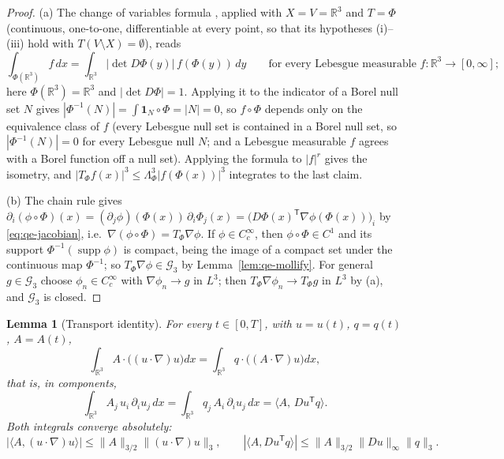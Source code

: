 \documentclass[11pt]{article}
\newtheorem{lemma}[theorem]{Lemma}
\theoremstyle{definition}
\theoremstyle{plain}
\newcommand{\R}{\mathbb R}
\newcommand{\norm}[1]{\lVert #1\rVert}
\begin{document}
\begin{proof}
(a) The change of variables formula \cite[Thm.~7.26]{Rudin1987}, applied
with $X=V=\R^3$ and $T=\Phi$ (continuous, one-to-one, differentiable at
every point, so that its hypotheses (i)--(iii) hold with
$T(V\setminus X)=\emptyset$), reads
\[
 \int_{\Phi(\R^3)}f\,dx=\int_{\R^3}|\det D\Phi(y)|\,f(\Phi(y))\,dy
 \qquad\text{for every Lebesgue measurable }f:\R^3\to[0,\infty];
\]
here $\Phi(\R^3)=\R^3$ and $|\det D\Phi|=1$.  Applying it to the indicator
of a Borel null set $N$ gives $|\Phi^{-1}(N)|=\int\mathbf 1_N\circ\Phi=|N|=0$,
so $f\circ\Phi$ depends only on the equivalence class of $f$ (every
Lebesgue null set is contained in a Borel null set, so
$|\Phi^{-1}(N)|=0$ for every Lebesgue null $N$; and a Lebesgue
measurable $f$ agrees with a Borel function off a null set).  Applying the
formula to $|f|^r$ gives the isometry, and
$|T_\Phi f(x)|^3\le\Lambda_\Phi^3|f(\Phi(x))|^3$ integrates to the last
claim.

(b) The chain rule gives
$\partial_i(\phi\circ\Phi)(x)=(\partial_j\phi)(\Phi(x))\,\partial_i\Phi_j(x)
=\bigl(D\Phi(x)^{\mathsf T}\nabla\phi(\Phi(x))\bigr)_i$ by
\eqref{eq:qe-jacobian}, i.e.\ $\nabla(\phi\circ\Phi)=T_\Phi\nabla\phi$.  If
$\phi\in C_c^\infty$, then $\phi\circ\Phi\in C^1$ and its support
$\Phi^{-1}(\operatorname{supp}\phi)$ is compact, being the image of a
compact set under the continuous map $\Phi^{-1}$; so
$T_\Phi\nabla\phi\in\mathcal G_3$ by Lemma~\ref{lem:qe-mollify}.  For
general $g\in\mathcal G_3$ choose $\phi_n\in C_c^\infty$ with
$\nabla\phi_n\to g$ in $L^3$; then $T_\Phi\nabla\phi_n\to T_\Phi g$ in
$L^3$ by (a), and $\mathcal G_3$ is closed.
\end{proof}

\begin{lemma}[Transport identity]\label{lem:quotient-transport}
For every $t\in[0,T]$, with $u=u(t)$, $q=q(t)$, $A=A(t)$,
\begin{equation}\label{eq:qe-transport}
 \int_{\R^3}A\cdot\bigl((u\cdot\nabla)u\bigr)dx
 =\int_{\R^3}q\cdot\bigl((A\cdot\nabla)u\bigr)dx ,
\end{equation}
that is, in components,
\begin{equation}\label{eq:qe-contraction}
 \int_{\R^3}A_j\,u_i\,\partial_iu_j\,dx
 =\int_{\R^3}q_j\,A_i\,\partial_iu_j\,dx
 =\langle A,\,Du^{\mathsf T}q\rangle .
\end{equation}
Both integrals converge absolutely:
\[
 |\langle A,(u\cdot\nabla)u\rangle|\le\norm A_{3/2}\norm{(u\cdot\nabla)u}_3,
 \qquad
 |\langle A,Du^{\mathsf T}q\rangle|\le\norm A_{3/2}\norm{Du}_\infty\norm q_3 .
\]
\end{lemma}
\end{document}
